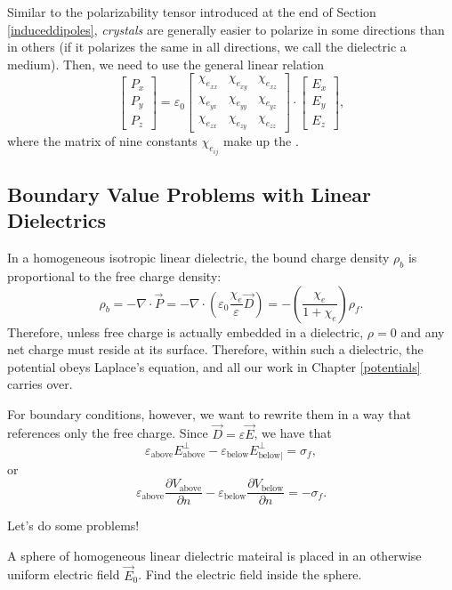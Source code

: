 Similar to the polarizability tensor introduced at the end of Section \ref{induceddipoles}, \textit{crystals} are generally easier to polarize in some directions than in others (if it polarizes the same in all directions, we call the dielectric a  medium). Then, we need to use the general linear relation
\[\begin{bmatrix}
P_x\\P_y\\P_z
\end{bmatrix}=\varepsilon_0\begin{bmatrix}
\chi_{e_{xx}} & \chi_{e_{xy}} & \chi_{e_{xz}}\\
\chi_{e_{yx}} & \chi_{e_{yy}} & \chi_{e_{yz}}\\
\chi_{e_{zx}} & \chi_{e_{zy}} & \chi_{e_{zz}}
\end{bmatrix}\cdot\begin{bmatrix}
E_x\\E_y\\E_z
\end{bmatrix},\]
where the matrix of nine constants $\chi_{e_{ij}}$ make up the .

\subsection{Boundary Value Problems with Linear Dielectrics}

In a homogeneous isotropic linear dielectric, the bound charge density $\rho_b$ is proportional to the free charge density:
\[\rho_b=-\nabla\cdot \vec{P}=-\nabla\cdot\left(\varepsilon_0\frac{\chi_e}{\varepsilon}\vec{D}\right)=-\left(\frac{\chi_e}{1+\chi_e}\right)\rho_f.\]
Therefore, unless free charge is actually embedded in a dielectric, $\rho=0$ and any net charge must reside at its surface. Therefore, within such a dielectric, the potential obeys Laplace's equation, and all our work in Chapter \ref{potentials} carries over.

For boundary conditions, however, we want to rewrite them in a way that references only the free charge. Since $\vec{D}=\varepsilon \vec{E}$, we have that
\[\varepsilon_{\text{above}}E_{\text{above}}^\perp -\varepsilon_{\text{below}}E_{\text{below|}}^\perp=\sigma_f,\]
or
\[\varepsilon_{\text{above}}\frac{\partial V_{\text{above}}}{\partial n}-\varepsilon_{\text{below}}\frac{\partial V_{\text{below}}}{\partial n}=-\sigma_f.\]

Let's do some problems!

\begin{example}
A sphere of homogeneous linear dielectric mateiral is placed in an otherwise uniform electric field $\vec{E}_0$. Find the electric field inside the sphere.
\end{example}

